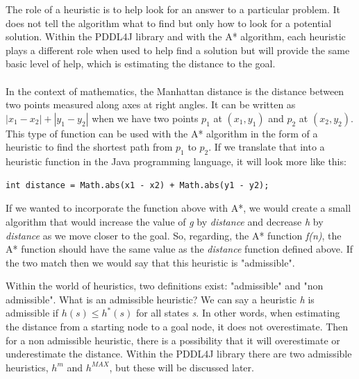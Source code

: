 The role of a heuristic is to help look for an answer to a particular problem. It does not tell the algorithm what to find but only how to look for a potential solution. Within the PDDL4J library and with the A* algorithm, each heuristic plays a different role when used to help find a solution but will provide the same basic level of help, which is estimating the distance to the goal. 
\\
\\
In the context of mathematics, the Manhattan distance is the distance between two points measured along axes at right angles\cite{ManhattanDistance}. It can be written as $|x_1 - x_2| + |y_1 - y_2|$ when we have two points $p_1$ at $(x_1, y_1)$ and $p_2$ at $(x_2, y_2)$. This type of function can be used with the A* algorithm in the form of a heuristic to find the shortest path from $p_1$ to $p_2$. If we translate that into a heuristic function in the Java programming language, it will look more like this:
\begin{verbatim}
int distance = Math.abs(x1 - x2) + Math.abs(y1 - y2);
\end{verbatim}

If we wanted to incorporate the function above with A*, we would create a small algorithm that would increase the value of \textit{g} by \textit{distance} and decrease \textit{h} by \textit{distance} as we move closer to the goal. So, regarding, the A* function \textit{f(n)}, the A* function should have the same value as the \textit{distance} function defined above. If the two match then we would say that this heuristic is "admissible". 

Within the world of heuristics, two definitions exist: "admissible" and "non admissible". What is an admissible heuristic? We can say a heuristic \textit{h} is admissible if $h(s) \leq h^*(s)$ for all states \textit{s}. In other words, when estimating the distance from a starting node to a goal node, it does not overestimate. Then for a non admissible heuristic, there is a possibility that it will overestimate or underestimate the distance. Within the PDDL4J library there are two admissible heuristics, $h^m$ and $h^{MAX}$, but these will be discussed later. 

